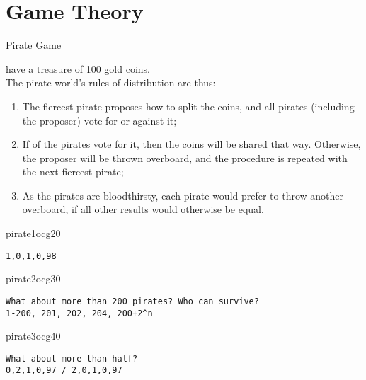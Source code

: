 \documentclass[UTF8,11pt,colorlinks,compress,openany]{beamer}%
\begin{document}
\section{Game Theory}


\begin{frame}[fragile]{\href{https://mp.weixin.qq.com/s/LLUoU0gl3t6GTh6jDef5vA}{Pirate Game}}
	\begin{problem}
		 have a treasure of 100 gold coins.\\
		The pirate world's rules of distribution are thus:
		\begin{enumerate}
			\item The fiercest pirate proposes how to split the coins, and all pirates (including the proposer) vote for or against it;
			\item If  of the pirates vote for it, then the coins will be shared that way. Otherwise, the proposer will be thrown overboard, and the procedure is repeated with the next fiercest pirate;
			\item As the pirates are bloodthirsty, each pirate would prefer to throw another overboard, if all other results would otherwise be equal.
		\end{enumerate}
	\end{problem}
\begin{ocg}{pirate1}{ocg2}{0}
\begin{verbatim}
1,0,1,0,98
\end{verbatim}
\end{ocg}
\begin{ocg}{pirate2}{ocg3}{0}
\begin{verbatim}
What about more than 200 pirates? Who can survive?
1-200, 201, 202, 204, 200+2^n
\end{verbatim}
\end{ocg}
\begin{ocg}{pirate3}{ocg4}{0}
\begin{verbatim}
What about more than half?
0,2,1,0,97 / 2,0,1,0,97
\end{verbatim}
\end{ocg}
\end{frame}
\end{document}
